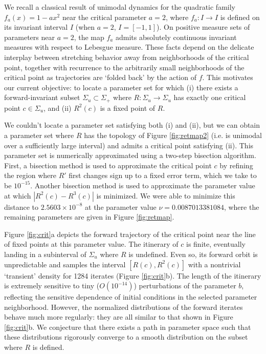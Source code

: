 \documentclass[aip, cha, sd, amsmath,amssymb, preprint]{revtex4-1}
\begin{document}
We recall a classical result of unimodal dynamics for the quadratic family $f_a(x) = 1 - ax^2$ near the critical parameter $a = 2$, where $f_a: I \to I$ is defined on its invariant interval $I$  (when $a = 2$, $I =  \left[ -1,1\right]$). On positive measure sets of parameters near $a = 2$, the map $f_a$ admits absolutely continuous invariant measures with respect to Lebesgue measure.\cite{jakobson1981} These facts depend on the delicate interplay between stretching behavior away from neighborhoods of the critical point, together with recurrence to the arbitrarily small neighborhoods of the critical point as trajectories are `folded back' by the action of $f$. This motivates our current objective: to locate a parameter set for which (i) there exists a forward-invariant subset $\Sigma_u \subset \Sigma_+ $ where $R: \Sigma_u \to \Sigma_u$ has exactly one critical point $c \in \Sigma_u$, and (ii) $R^2(c)$ is a fixed point of $R$.

We couldn't locate a parameter set satisfying both (i) and (ii), but we can obtain a parameter set where $R$ has the topology of Figure \ref{fig:retmap2} (i.e. is unimodal over a sufficiently large interval) and admits a critical point satisfying (ii). This parameter set is numerically approximated using a two-step bisection algorithm. First, a bisection method is used to approximate the critical point $c$ by refining the region where $R'$ first changes sign up to a fixed error term, which we take to be $10^{-15}$. Another bisection method is used to approximate the parameter value at which $|R^2(c) - R^3(c)|$ is minimized. We were able to minimize this distance to $2.5603\times 10^{-8}$ at the parameter value $\nu = 0.0087013381084$, where the remaining parameters are given in Figure \ref{fig:retmap}.

Figure \ref{fig:crit}a depicts the forward trajectory of the critical point near the line of fixed points at this parameter value. The itinerary of $c$ is finite, eventually landing in a subinterval of $\Sigma_u$ where $R$ is undefined. Even so, its forward orbit is unpredictable and samples the interval $\left[ R(c), R^2(c)\right]$ with a nontrivial `transient' density for 1284 iterates (Figure \ref{fig:crit}b). The length of the itinerary is extremely sensitive to tiny ($O(10^{-14})$) perturbations of the parameter $b$, reflecting the sensitive dependence of initial conditions in the selected parameter neighborhood. However, the normalized distributions of the forward iterates behave much more regularly: they are all similar to that shown in Figure \ref{fig:crit}b. We conjecture that there exists a path in parameter space such that these distributions rigorously converge to a smooth distribution on the subset where $R$ is defined.
\end{document}
